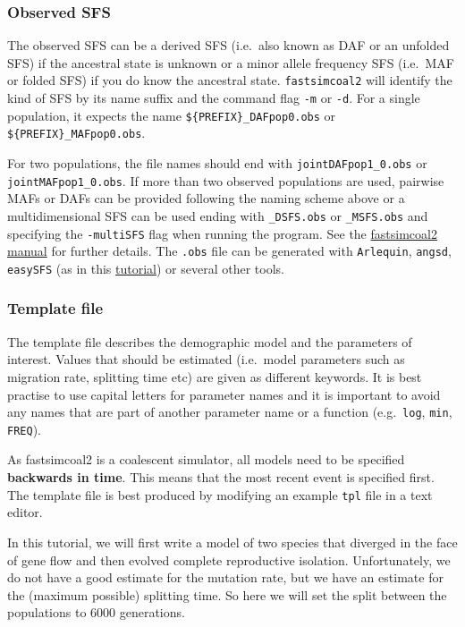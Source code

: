 \documentclass[
  letterpaper,
  DIV=11,
  numbers=noendperiod]{scrartcl}
\begin{document}
\hypertarget{observed-sfs}{%
\subsubsection{Observed SFS}\label{observed-sfs}}

The observed SFS can be a derived SFS (i.e.~also known as DAF or an
unfolded SFS) if the ancestral state is unknown or a minor allele
frequency SFS (i.e.~MAF or folded SFS) if you do know the ancestral
state. \texttt{fastsimcoal2} will identify the kind of SFS by its name
suffix and the command flag \texttt{-m} or \texttt{-d}. For a single
population, it expects the name \texttt{\$\{PREFIX\}\_DAFpop0.obs} or
\texttt{\$\{PREFIX\}\_MAFpop0.obs}.

For two populations, the file names should end with
\texttt{jointDAFpop1\_0.obs} or \texttt{jointMAFpop1\_0.obs}. If more
than two observed populations are used, pairwise MAFs or DAFs can be
provided following the naming scheme above or a multidimensional SFS can
be used ending with \texttt{\_DSFS.obs} or \texttt{\_MSFS.obs} and
specifying the \texttt{-multiSFS} flag when running the program. See the
\href{http://cmpg.unibe.ch/software/fastsimcoal2/}{fastsimcoal2 manual}
for further details. The \texttt{.obs} file can be generated with
\texttt{Arlequin}, \texttt{angsd}, \texttt{easySFS} (as in this
\href{https://speciationgenomics.github.io/easysfs/}{tutorial}) or
several other tools.

\hypertarget{template-file}{%
\subsubsection{Template file}\label{template-file}}

The template file describes the demographic model and the parameters of
interest. Values that should be estimated (i.e.~model parameters such as
migration rate, splitting time etc) are given as different keywords. It
is best practise to use capital letters for parameter names and it is
important to avoid any names that are part of another parameter name or
a function (e.g.~\texttt{log}, \texttt{min}, \texttt{FREQ}).

As fastsimcoal2 is a coalescent simulator, all models need to be
specified \textbf{backwards in time}. This means that the most recent
event is specified first. The template file is best produced by
modifying an example \texttt{tpl} file in a text editor.

In this tutorial, we will first write a model of two species that
diverged in the face of gene flow and then evolved complete reproductive
isolation. Unfortunately, we do not have a good estimate for the
mutation rate, but we have an estimate for the (maximum possible)
splitting time. So here we will set the split between the populations to
6000 generations.
\end{document}
